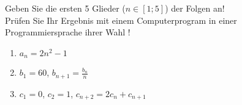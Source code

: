 \item Geben Sie die ersten 5 Glieder ($n \in [1;5]$) der Folgen an!\\
Prüfen Sie Ihr Ergebnis mit einem Computerprogram in einer Programmiersprache ihrer Wahl !
\begin {enumerate}
\item $a_n = 2n^2-1$
\item $b_1 = 60$, $b_{n+1} = \frac{b_n}{n}$
\item $c_1 = 0$, $c_2=1$, $c_{n+2} = 2c_n + c_{n+1}$
\end {enumerate}

